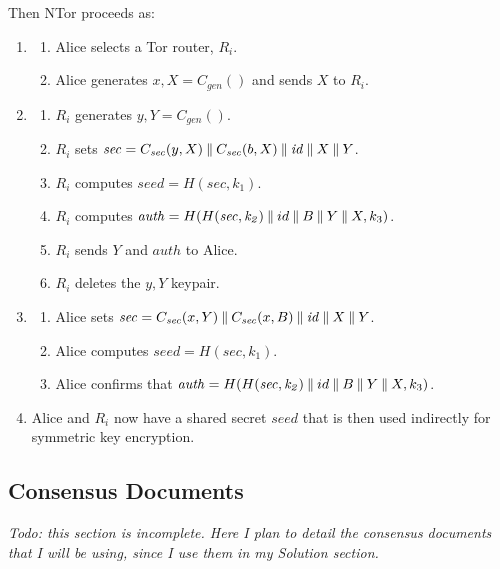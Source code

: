 Then NTor proceeds as:

\begin{enumerate} %
	\item \label{item:First2}
		\begin{enumerate}
			\item Alice selects a Tor router, $ R_{i} $.
			\item Alice generates $ x,X = C_{\mathit{gen}}() $ and sends $ X $ to $ R_{i} $.
		\end{enumerate}
	\item
		\begin{enumerate}
			\item $ R_{i} $ generates $ y,Y = C_{\mathit{gen}}() $.
			\item $ R_{i} $ sets $ \mathit{sec} = C_{\mathit{sec}}(y, X) \mathbin{\|} C_{\mathit{sec}}(b, X) \mathbin{\|} \mathit{id} \mathbin{\|} X \mathbin{\|} Y $.
			\item $ R_{i} $ computes $ \mathit{seed} = H(\mathit{sec, k_{1}}) $.
			\item $ R_{i} $ computes $ \mathit{auth} = H(H(\mathit{sec, k_{2}}) \mathbin{\|} id \mathbin{\|} B \mathbin{\|} Y \mathbin{\|} X, k_{3}) $.
			\item $ R_{i} $ sends $ Y $ and $ \mathit{auth} $ to Alice.
			\item $ R_{i} $ deletes the $ y,Y $ keypair.
		\end{enumerate}
	\item
		\begin{enumerate}
			\item Alice sets $ \mathit{sec} = C_{\mathit{sec}}(x, Y) \mathbin{\|} C_{\mathit{sec}}(x, B) \mathbin{\|} \mathit{id} \mathbin{\|} X \mathbin{\|} Y $.
			\item Alice computes $ \mathit{seed} = H(\mathit{sec, k_{1}}) $.
			\item Alice confirms that $ \mathit{auth} = H(H(\mathit{sec, k_{2}}) \mathbin{\|} id \mathbin{\|} B \mathbin{\|} Y \mathbin{\|} X, k_{3}) $.
		\end{enumerate}
	\item
		Alice and $ R_{i} $ now have a shared secret $ \mathit{seed} $ that is then used indirectly for symmetric key encryption.	
\end{enumerate}

\subsection{Consensus Documents}
\label{sec:ConsensusDocs}

\emph{Todo: this section is incomplete. Here I plan to detail the consensus documents that I will be using, since I use them in my Solution section.}

